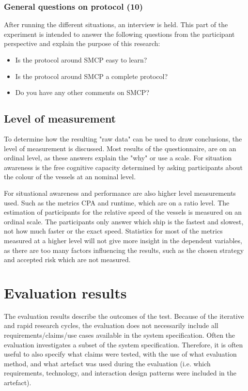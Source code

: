 \subsubsection{General questions on protocol (10)}
After running the different situations, an interview is held. This part of the experiment is intended to answer the following questions from the participant perspective and explain the purpose of this research:
\begin{spacing}{.9}
	\begin{itemize}
		\item Is the protocol around \ac{SMCP} easy to learn? \protocol
		\item Is the protocol around \ac{SMCP} a complete protocol? \protocol
		\item Do you have any other comments on \ac{SMCP}? \protocol
	\end{itemize}
\end{spacing}

\subsection{Level of measurement}
To determine how the resulting "raw data" can be used to draw conclusions, the level of measurement is discussed. Most results of the questionnaire, are on an ordinal level, as these answers explain the "why" or use a scale. For situation awareness is the free cognitive capacity determined by asking participants about the colour of the vessels at an nominal level.

For situational awareness and performance are also higher level measurements used. Such as the metrics \ac{CPA} and runtime, which are on a ratio level. 
The estimation of participants for the relative speed of the vessels is measured on an ordinal scale. The participants only answer which ship is the fastest and slowest, not how much faster or the exact speed.
Statistics for most of the metrics measured at a higher level will not give more insight in the dependent variables, as there are too many factors influencing the results, such as the chosen strategy and accepted risk which are not measured.

\newpage

\section{Evaluation results}
The evaluation results describe the outcomes of the test. Because of the iterative and rapid research cycles, the evaluation does not necessarily include all requirements/claims/use cases available in the system specification. Often the evaluation investigates a subset of the system specification. Therefore, it is often useful to also specify what claims were tested, with the use of what evaluation method, and what artefact was used during the evaluation (i.e. which requirements, technology, and interaction design patterns were included in the artefact).

